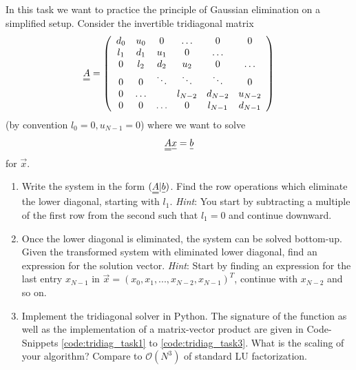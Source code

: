  \label{problem:tridiag}
    In this task we want to practice the principle of 
    Gaussian elimination on a simplified setup. Consider
    the invertible tridiagonal matrix
    \begin{equation}
        \mat{A} = \left( \begin{array}{cccccc}
            d_0 & u_0 & 0 & \dots & 0 & 0 \\
            l_1 & d_1 & u_1 & 0 & \dots &  \\
            0 & l_2 & d_2 & u_2 & 0 & \dots \\
            0 & 0 & \ddots & \ddots & \ddots & 0 \\
            0 & \dots &  & l_{N-2} & d_{N-2} & u_{N-2} \\
            0 & 0 & \dots & 0 & l_{N-1} & d_{N-1}
        \end{array} \right)
    \end{equation}
    (by convention $l_0 = 0, u_{N-1} = 0$) where we want to solve
    \begin{equation}
        \mat{A} \vec{x} = \vec{b}
    \end{equation}
    for $\vec{x}$.
    \begin{enumerate}
        \item Write the system in the form $(\mat{A}|\vec{b})$. Find the row operations which eliminate the lower diagonal, starting
        with $l_1$. \textit{Hint}: You start by subtracting a multiple of the first row from the second such that $l_1 = 0$ and continue downward.
        \item Once the lower diagonal is eliminated, the system can be solved bottom-up. Given the transformed system
        with eliminated lower diagonal, find an expression for the solution vector. \textit{Hint}: Start by finding an expression for 
        the last entry $x_{N-1}$ in $\vec{x} = (x_0, x_1, ..., x_{N-2}, x_{N-1})^T$, continue with $x_{N-2}$ and so on.
        \item Implement the tridiagonal solver in Python. The signature of the function as well as the 
        implementation of a matrix-vector product are given in Code-Snippets \ref{code:tridiag_task1} to \ref{code:tridiag_task3}. What is the
        scaling of your algorithm? Compare to $\mathcal{O}(N^3)$ of standard LU factorization.
    \end{enumerate}

